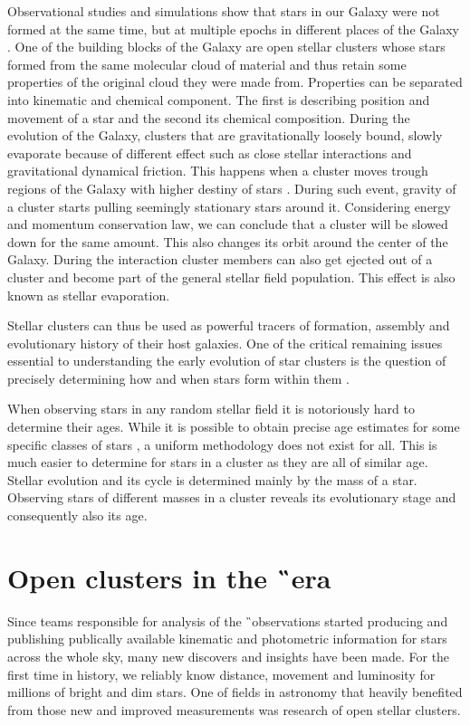 Observational studies and simulations show that stars in our Galaxy were not formed at the same time, but at multiple epochs in different places of the Galaxy \citep{2001ApJ...554.1044C, 2017ARA&A..55...59N}. One of the building blocks of the Galaxy are open stellar clusters whose stars formed from the same molecular cloud of material \citep{2003ARA&A..41...57L} and thus retain some properties of the original cloud they were made from. Properties can be separated into kinematic and chemical component. The first is describing position and movement of a star and the second its chemical composition. During the evolution of the Galaxy, clusters that are gravitationally loosely bound, slowly evaporate because of different effect such as close stellar interactions and gravitational dynamical friction. This happens when a cluster moves trough regions of the Galaxy with higher destiny of stars \citep{2010MNRAS.401.2753B}. During such event, gravity of a cluster starts pulling seemingly stationary stars around it. Considering energy and momentum conservation law, we can conclude that a cluster will be slowed down for the same amount. This also changes its orbit around the center of the Galaxy. During the interaction cluster members can also  get ejected out of a cluster and become part of the general stellar field population. This effect is also known as stellar evaporation.

Stellar clusters can thus be used as powerful tracers of formation, assembly and evolutionary history of their host galaxies. One of the critical remaining issues essential to understanding the early evolution of star clusters is the question of precisely determining how and when stars form within them \citep{2010RSPTA.368..693D}.

When observing stars in any random stellar field it is notoriously hard to determine their ages. While it is possible to obtain precise age estimates for some specific classes of stars \citep{2010ARA&A..48..581S}, a uniform methodology does not exist for all. This is much easier to determine for stars in a cluster as they are all of similar age. Stellar evolution and its cycle is determined mainly by the mass of a star. Observing stars of different masses in a cluster reveals its evolutionary stage and consequently also its age.



\section{Open clusters in the \G\ era}
Since teams responsible for analysis of the \G\ observations started producing and publishing publically available kinematic and photometric information for stars across the whole sky, many new discovers and insights have been made. For the first time in history, we reliably know distance, movement and luminosity for millions of bright and dim stars. One of fields in astronomy that heavily benefited from those new and improved measurements was research of open stellar clusters.

